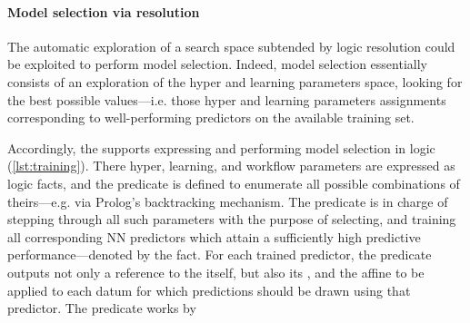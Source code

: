 \documentclass[runningheads]{llncs}
\begin{document}
\paragraph{Model selection via resolution}
\label{par:model-selection}

The automatic exploration of a search space subtended by logic resolution could be exploited to perform model selection.
%
Indeed, model selection essentially consists of an exploration of the hyper and learning parameters space, looking for the best possible values---i.e. those hyper and learning parameters assignments corresponding to well-performing predictors on the available training set.

Accordingly, the \mllib{} supports expressing and performing model selection in logic (\cref{lst:training}).
%
{}
\bigskip
%
There hyper, learning, and workflow parameters are expressed as logic facts, and the  predicate is defined to enumerate all possible combinations of theirs---e.g. via Prolog's backtracking mechanism.
%
The  predicate is in charge of stepping through all such parameters with the purpose of selecting, and training all corresponding NN predictors which attain a sufficiently high predictive performance---denoted by the  fact.
%
For each trained predictor, the predicate outputs not only a reference to the  itself, but also its , and the affine  to be applied to each datum for which predictions should be drawn using that predictor.
%
The predicate  works by
%
\end{document}
